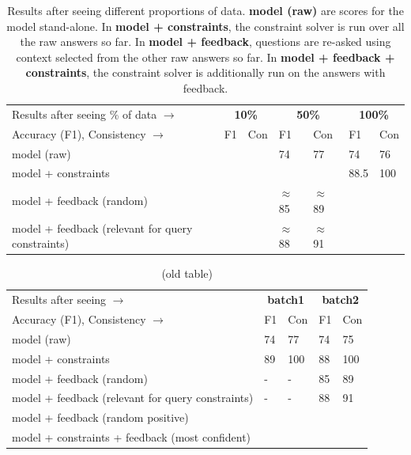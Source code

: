 \documentclass[11pt]{article}
\begin{document}
\begin{table}
\centering
{\small
\begin{tabular}{|l|ll|ll|ll|} \hline
Results after seeing \% of data $\rightarrow$ & \multicolumn{2}{|c|}{\bf 10\%} &
\multicolumn{2}{|c|}{\bf 50\%} &
\multicolumn{2}{|c|}{\bf 100\%} \\
Accuracy (F1), Consistency $\rightarrow$ & F1 & Con & F1 & Con & F1 & Con\\ \hline           
model (raw) & & & 74 & 77 & 74 & 76 \\
model + constraints & & & & & 88.5 & 100 \\
model + feedback (random)&  & & $\approx$85  & $\approx$89  &  &  \\
model + feedback (relevant for query constraints) & & & $\approx$88 & $\approx$91 & & \\\hline
\end{tabular}
}
\caption{Results after seeing different proportions of data.
{\bf model (raw)} are scores for the model stand-alone.
In {\bf model + constraints}, the constraint solver is run over all
the raw answers so far. In {\bf model + feedback}, questions are re-asked
using context selected from the other raw answers so far. In {\bf model + feedback + constraints},
the constraint solver is additionally run on the answers with feedback. 
\label{results}}
\end{table}

\begin{table}
\centering
{\small
\begin{tabular}{|l|ll|ll|} \hline
Results after seeing $\rightarrow$ & \multicolumn{2}{|c|}{\bf batch1} &
\multicolumn{2}{|c|}{{\bf batch2}} \\
Accuracy (F1), Consistency $\rightarrow$ & F1 & Con & F1 & Con\\ \hline           
model (raw) & 74 & 77 &74 & 75 \\
model + constraints & 89&100& 88&100\\
model + feedback (random)& - & - & 85 & 89\\

model + feedback (relevant for query constraints)&-&-&88&91\\\hline
model + feedback (random positive) &&\\
model + constraints + feedback (most confident) &&\\\hline
\end{tabular}
}
\caption{(old table)}
\end{table}
\end{document}
